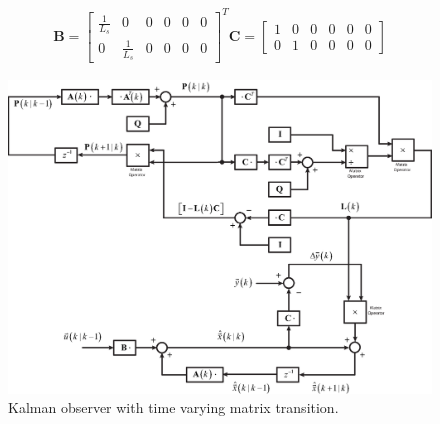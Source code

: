 \documentclass[11pt,a4paper,oneside]{book}
\numberwithin{equation}{section}
\theoremstyle{it}
\theoremstyle{definition}
\begin{document}
\begin{mybox}
\begin{equation}
		\begin{aligned}
			\mathbf{B} = \begin{bmatrix} \frac{1}{L_s}&0&0&0&0&0 \\[6pt] 
				0&\frac{1}{L_s}&0&0&0&0 \end{bmatrix}^T
			\mathbf{C} = \begin{bmatrix} 1&0&0&0&0&0 \\[6pt] 0&1&0&0&0&0 
			\end{bmatrix}
		\end{aligned}
	\end{equation} 
	\begin{figure}[H]
		\centering
		\includegraphics[width = 440pt, angle=0, 
		keepaspectratio]{figures/mpc/kalman_3.eps}
		\captionsetup{width=.5\textwidth}
		\caption{Kalman observer with time varying matrix transition.}
		\label{EKF}
	\end{figure}
\end{mybox}
\end{document}
